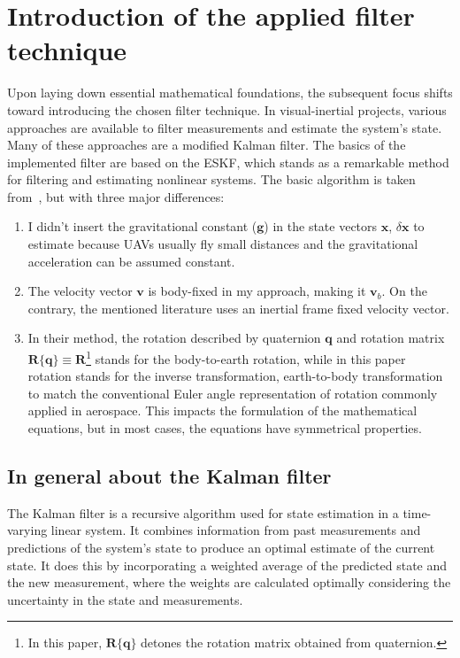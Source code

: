 \chapter{Introduction of the applied filter technique}\label{chap:eskf}

Upon laying down essential mathematical foundations, the subsequent focus shifts toward introducing the chosen filter technique. In visual-inertial projects, various approaches are available to filter measurements and estimate the system's state. Many of these approaches are a modified Kalman filter. The basics of the implemented filter are based on the ESKF, which stands as a remarkable method for filtering and estimating nonlinear systems. The basic algorithm is taken from~\cite{quaternion-eskf}, but with three major differences:
\begin{enumerate}
    \item 
    I didn't insert the gravitational constant ($\mathbf{g}$)  in the state vectors $\mathbf{x}$, $\delta\mathbf{x}$ to estimate because UAVs usually fly small distances and the gravitational acceleration can be assumed constant.
    
    \item
    The velocity vector $\mathbf{v}$ is body-fixed in my approach, making it $\mathbf{v}_b$. On the contrary, the mentioned literature uses an inertial frame fixed velocity vector.
    
    \item 
    In their method, the rotation described by quaternion $\mathbf{q}$ and rotation matrix $\mathbf{R}\{\mathbf{q}\}\equiv\mathbf{R}$\footnote{In this paper, $\mathbf{R}\{\mathbf{q}\}$ detones the rotation matrix obtained from quaternion.} stands for the body-to-earth rotation, while in this paper rotation stands for the inverse transformation, earth-to-body transformation to match the conventional Euler angle representation of rotation commonly applied in aerospace. This impacts the formulation of the mathematical equations, but in most cases, the equations have symmetrical properties.
\end{enumerate}

\section{In general about the Kalman filter}

 The Kalman filter is a recursive algorithm used for state estimation in a time-varying linear system. It combines information from past measurements and predictions of the system's state to produce an optimal estimate of the current state. It does this by incorporating a weighted average of the predicted state and the new measurement, where the weights are calculated optimally considering the uncertainty in the state and measurements.

